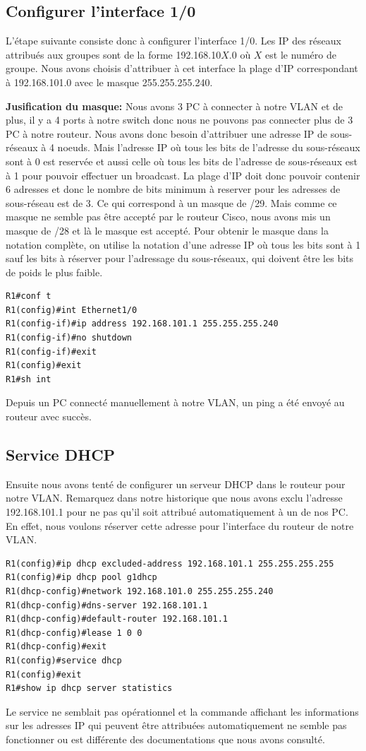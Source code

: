 \documentclass[a4paper,10pt]{article}
\begin{document}
\subsection{Configurer l'interface 1/0}
L'étape suivante consiste donc à configurer l'interface 1/0.
Les IP des réseaux attribués aux groupes sont de la forme 192.168.10$X$.0 où $X$ est le numéro de groupe.
Nous avons choisis d'attribuer à cet interface la plage d'IP correspondant à 192.168.101.0 avec le masque 255.255.255.240.

\textbf{Jusification du masque:} Nous avons 3 PC à connecter à notre VLAN et de plus, il y a 4 ports à notre switch donc nous ne pouvons pas connecter plus de 3 PC à notre routeur.
Nous avons donc besoin d'attribuer une adresse IP de sous-réseaux à 4 noeuds.
Mais l'adresse IP où tous les bits de l'adresse du sous-réseaux sont à 0 est reservée et aussi celle où tous les bits de l'adresse de sous-réseaux est à 1 pour pouvoir effectuer un broadcast.
La plage d'IP doit donc pouvoir contenir 6 adresses et donc le nombre de bits minimum à reserver pour les adresses de sous-réseau est de 3.
Ce qui correspond à un masque de /29.
Mais comme ce masque ne semble pas être accepté par le routeur Cisco, nous avons mis un masque de /28 et là le masque est accepté.
Pour obtenir le masque dans la notation complète, on utilise la notation d'une adresse IP où tous les bits sont à 1 sauf les bits à réserver pour l'adressage du sous-réseaux, qui doivent être les bits de poids le plus faible.
\begin{verbatim}
R1#conf t
R1(config)#int Ethernet1/0
R1(config-if)#ip address 192.168.101.1 255.255.255.240
R1(config-if)#no shutdown
R1(config-if)#exit
R1(config)#exit
R1#sh int
\end{verbatim}
Depuis un PC connecté manuellement à notre VLAN, un ping a été envoyé au routeur avec succès.

\subsection{Service DHCP}
Ensuite nous avons tenté de configurer un serveur DHCP dans le routeur pour notre VLAN.
Remarquez dans notre historique que nous avons exclu l'adresse 192.168.101.1 pour ne pas qu'il soit attribué automatiquement à un de nos PC.
En effet, nous voulons réserver cette adresse pour l'interface du routeur de notre VLAN.
\begin{verbatim}
R1(config)#ip dhcp excluded-address 192.168.101.1 255.255.255.255
R1(config)#ip dhcp pool g1dhcp
R1(dhcp-config)#network 192.168.101.0 255.255.255.240
R1(dhcp-config)#dns-server 192.168.101.1
R1(dhcp-config)#default-router 192.168.101.1
R1(dhcp-config)#lease 1 0 0
R1(dhcp-config)#exit
R1(config)#service dhcp
R1(config)#exit
R1#show ip dhcp server statistics
\end{verbatim}
Le service ne semblait pas opérationnel et la commande affichant les informations sur les adresses IP qui peuvent être attribuées automatiquement ne semble pas fonctionner ou est différente des documentations que nous avons consulté.
\end{document}
